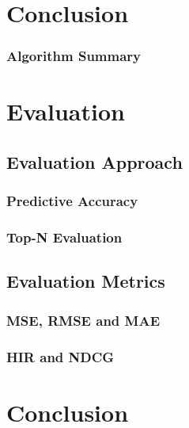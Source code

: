 \section{Conclusion}
\label{sec:Conclusion}





\subsubsection{Algorithm Summary}
\label{subsubsec:Algorithm Summary}

\section{Evaluation}
\label{sec:Evaluation}

\subsection{Evaluation Approach}
\label{subsec:Evaluation Approach}

\subsubsection{Predictive Accuracy}
\label{subsubsec:Predictive Accuracy}

\subsubsection{Top-N Evaluation}
\label{subsubsec:Top-N Evaluation}

\subsection{Evaluation Metrics}
\label{subsec:Evaluation Metrics}

\subsubsection{MSE, RMSE and MAE}
\label{subsubsec:MSE, RMSE and MAE}

\subsubsection{HIR and NDCG}
\label{subsubsec:HIR and NDCG}

\section{Conclusion}
\label{sec:Conclusion}



